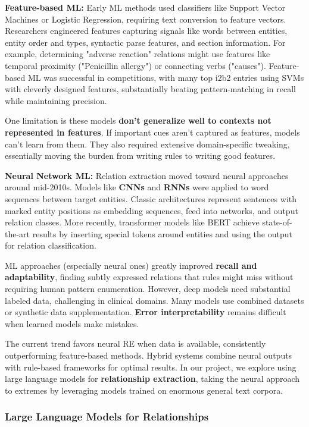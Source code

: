 \textbf{Feature-based ML:} Early ML methods used classifiers like Support Vector Machines or Logistic Regression, requiring text conversion to feature vectors. Researchers engineered features capturing signals like words between entities, entity order and types, syntactic parse features, and section information. For example, determining "adverse reaction" relations might use features like temporal proximity ("Penicillin allergy") or connecting verbs ("causes"). Feature-based ML was successful in competitions, with many top i2b2 entries using SVMs with cleverly designed features, substantially beating pattern-matching in recall while maintaining precision.

One limitation is these models \textbf{don't generalize well to contexts not represented in features}. If important cues aren't captured as features, models can't learn from them. They also required extensive domain-specific tweaking, essentially moving the burden from writing rules to writing good features.

\textbf{Neural Network ML:} Relation extraction moved toward neural approaches around mid-2010s. Models like \textbf{CNNs} and \textbf{RNNs} were applied to word sequences between target entities. Classic architectures represent sentences with marked entity positions as embedding sequences, feed into networks, and output relation classes. More recently, transformer models like BERT achieve state-of-the-art results by inserting special tokens around entities and using the output for relation classification.

ML approaches (especially neural ones) greatly improved \textbf{recall and adaptability}, finding subtly expressed relations that rules might miss without requiring human pattern enumeration. However, deep models need substantial labeled data, challenging in clinical domains. Many models use combined datasets or synthetic data supplementation. \textbf{Error interpretability} remains difficult when learned models make mistakes.

The current trend favors neural RE when data is available, consistently outperforming feature-based methods. Hybrid systems combine neural outputs with rule-based frameworks for optimal results. In our project, we explore using large language models for \textbf{relationship extraction}, taking the neural approach to extremes by leveraging models trained on enormous general text corpora.

\subsubsection{Large Language Models for Relationships}

